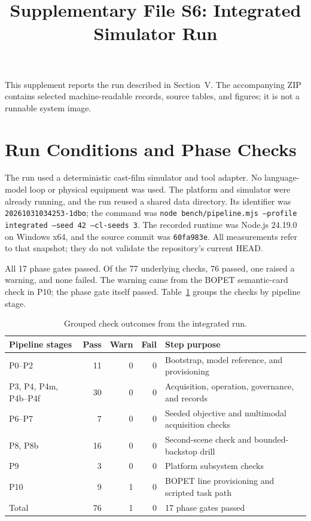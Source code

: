 \documentclass[journal]{IEEEtran}
\title{Supplementary File S6: Integrated Simulator Run}
\author{}
\begin{document}
\maketitle

\noindent This supplement reports the run described in Section~V. The
accompanying ZIP contains selected machine-readable records, source tables,
and figures; it is not a runnable system image.

\section{Run Conditions and Phase Checks}
The run used a deterministic cast-film simulator and tool adapter. No
language-model loop or physical equipment was used. The platform and
simulator were already running, and the run reused a shared data directory.
Its identifier was \texttt{20261031034253-1dbo}; the command was
\texttt{node bench/pipeline.mjs --profile integrated --seed 42 --cl-seeds 3}.
The recorded runtime was Node.js 24.19.0 on Windows x64, and the source
commit was \texttt{60fa983e}. All measurements refer to that snapshot; they
do not validate the repository's current HEAD.

All 17 phase gates passed. Of the 77 underlying checks, 76 passed, one raised
a warning, and none failed. The warning came from the BOPET semantic-card
check in P10; the phase gate itself passed. Table~\ref{tab:s6-stages} groups
the checks by pipeline stage.

\begin{table}[!t]
\centering
\caption{Grouped check outcomes from the integrated run.}
\label{tab:s6-stages}
\footnotesize
\setlength{\tabcolsep}{3pt}
\begin{tabularx}{\columnwidth}{@{}>{\raggedright\arraybackslash}p{2.65cm}r r r X@{}}
\toprule
Pipeline stages & Pass & Warn & Fail & Step purpose\\
\midrule
P0--P2 & 11 & 0 & 0 & Bootstrap, model reference, and provisioning\\
P3, P4, P4m, P4b--P4f & 30 & 0 & 0 & Acquisition, operation, governance, and records\\
P6--P7 & 7 & 0 & 0 & Seeded objective and multimodal acquisition checks\\
P8, P8b & 16 & 0 & 0 & Second-scene check and bounded-backstop drill\\
P9 & 3 & 0 & 0 & Platform subsystem checks\\
P10 & 9 & 1 & 0 & BOPET line provisioning and scripted task path\\
\midrule
Total & 76 & 1 & 0 & 17 phase gates passed\\
\bottomrule
\end{tabularx}
\end{table}
\end{document}
